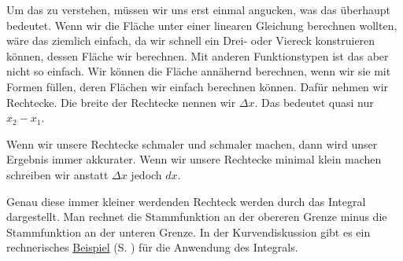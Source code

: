 \documentclass[12pt]{article}
\newcommand{\highlight}[2]{\textcolor{blue}{\hyperref[#1]{#2}} (S. \pageref{#1})}
\begin{document}
		\noindent Um das zu verstehen, müssen wir uns erst einmal angucken, was das überhaupt bedeutet. Wenn wir die Fläche unter einer linearen Gleichung berechnen wollten, wäre das ziemlich einfach, da wir schnell ein Drei- oder Viereck konstruieren können, dessen Fläche wir berechnen. Mit anderen Funktionstypen ist das aber nicht so einfach. Wir können die Fläche annähernd berechnen, wenn wir sie mit Formen füllen, deren Flächen wir einfach berechnen können. Dafür nehmen wir Rechtecke. Die breite der Rechtecke nennen wir $\Delta x$. Das bedeutet quasi nur $x_2-x_1$.
		\begin{center}
		\end{center}
		Wenn wir unsere Rechtecke schmaler und schmaler machen, dann wird unser Ergebnis immer akkurater. Wenn wir unsere Rechtecke minimal klein machen schreiben wir anstatt $\Delta x$ jedoch $dx$.
		\begin{center}
		\end{center}
		Genau diese immer kleiner werdenden Rechteck werden durch das Integral dargestellt. Man rechnet die Stammfunktion an der obereren Grenze minus die Stammfunktion an der unteren Grenze. In der Kurvendiskussion gibt es ein rechnerisches \highlight{subsubsec:flaechenberechnung}{Beispiel} für die Anwendung des Integrals.
\end{document}
